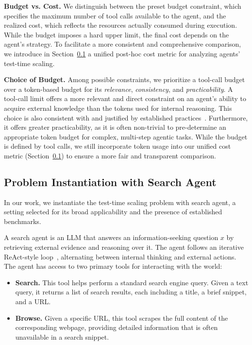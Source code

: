 \textbf{Budget vs. Cost.} We distinguish between the preset budget constraint, which specifies the maximum number of tool calls available to the agent, and the realized cost, which reflects the resources actually consumed during execution. While the budget imposes a hard upper limit, the final cost depends on the agent's strategy. To facilitate a more consistent and comprehensive comparison, we introduce in Section~\ref{sec:prob_instantiation} a unified post-hoc cost metric for analyzing agents' test-time scaling.

\textbf{Choice of Budget.} Among possible constraints, we prioritize a tool-call budget over a token-based budget for its \textit{relevance}, \textit{consistency}, and \textit{practicability}. A tool-call limit offers a more relevant and direct constraint on an agent's ability to acquire external knowledge than the tokens used for internal reasoning. This choice is also consistent with and justified by established practices~\citep{DBLP:journals/corr/abs-2506-07976, miromindteam2025mirothinkerpushingperformanceboundaries}. Furthermore, it offers greater practicability, as it is often non-trivial to pre-determine an appropriate token budget for complex, multi-step agentic tasks. While the budget is defined by tool calls, we still incorporate token usage into our unified cost metric (Section~\ref{sec:prob_instantiation}) to ensure a more fair and transparent comparison.


\subsection{Problem Instantiation with Search Agent}
\label{sec:prob_instantiation}
In our work, we instantiate the test-time scaling problem with search agent, a setting selected for its broad applicability and the presence of established benchmarks.

A search agent is an LLM that answers an information-seeking question $x$ by retrieving external evidence and reasoning over it. The agent follows an iterative ReAct-style loop~\citep{DBLP:conf/iclr/YaoZYDSN023}, alternating between internal thinking and external actions. The agent has access to two primary tools for interacting with the world:
\begin{itemize}
    \item \textbf{Search.} This tool helps perform a standard search engine query. Given a text query, it returns a list of search results, each including a title, a brief snippet, and a URL.
    \item \textbf{Browse.} Given a specific URL, this tool scrapes the full content of the corresponding webpage, providing detailed information that is often unavailable in a search snippet.
\end{itemize}



